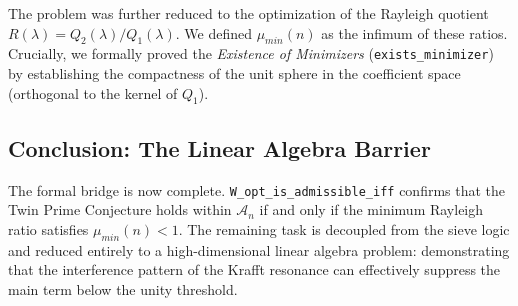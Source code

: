 \documentclass[12pt]{article}
\begin{document}
The problem was further reduced to the optimization of the Rayleigh quotient
$R(\lambda) = Q_2(\lambda)/Q_1(\lambda)$. We defined $\mu_{min}(n)$ as the infimum of these ratios.
Crucially, we formally proved the \textit{Existence of Minimizers} (\texttt{exists\_minimizer})
by establishing the compactness of the unit sphere in the coefficient space (orthogonal to the
kernel of $Q_1$). 

\subsection{Conclusion: The Linear Algebra Barrier}

The formal bridge is now complete. \texttt{W\_opt\_is\_admissible\_iff} confirms that the Twin Prime
Conjecture holds within $\mathcal{A}_n$ if and only if the minimum Rayleigh ratio satisfies
$\mu_{min}(n) < 1$. The remaining task is decoupled from the sieve logic and reduced entirely to
a high-dimensional linear algebra problem: demonstrating that the interference pattern of the
Krafft resonance can effectively suppress the main term below the unity threshold.
\end{document}
